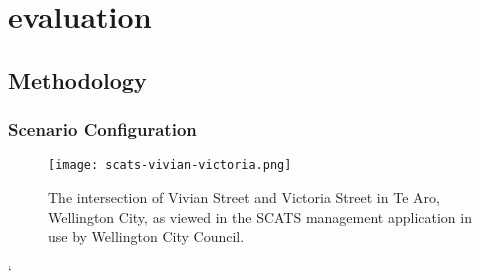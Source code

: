 \chapter{evaluation}

\section{Methodology}

\subsection{Scenario Configuration}

\begin{figure}[]
\centering
	\texttt{[image: scats-vivian-victoria.png]}
	\caption{ The intersection of Vivian Street and Victoria Street in Te Aro, Wellington City, as viewed in the SCATS management application in use by Wellington City Council. }
\label{intersectiondiagram}
\end{figure}`